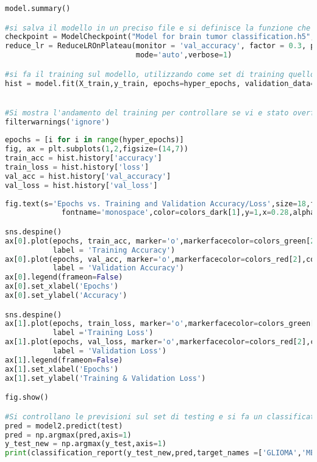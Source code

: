 \begin{lstlisting}[basicstyle=\tiny, language=Python, caption=Esempio di implementazione di AlexNet per la classificazione di RM con l'aggiunta di rumore al set di training.~\cite{dsbrain} ]
model.summary()

#si salva il modello in un preciso file e si definisce la funzione che regola il learning rate
checkpoint = ModelCheckpoint("Model for brain tumor classification.h5",monitor="val_accuracy",save_best_only=True,mode="auto",verbose=1)
reduce_lr = ReduceLROnPlateau(monitor = 'val_accuracy', factor = 0.3, patience = 2, min_delta = 0.001,min_lr= 0.000001,
                              mode='auto',verbose=1)

#si fa il training sul modello, utilizzando come set di training quello affetto da rumore
hist = model.fit(X_train,y_train, epochs=hyper_epochs, validation_data= (X_test,y_test),callbacks=[checkpoint,reduce_lr])


#Si mostra l'andamento del training per controllare se vi e stato overfitting  underfitting
filterwarnings('ignore') 
 
epochs = [i for i in range(hyper_epochs)]
fig, ax = plt.subplots(1,2,figsize=(14,7))
train_acc = hist.history['accuracy']
train_loss = hist.history['loss'] 
val_acc = hist.history['val_accuracy']
val_loss = hist.history['val_loss']
 
fig.text(s='Epochs vs. Training and Validation Accuracy/Loss',size=18,fontweight='bold',
             fontname='monospace',color=colors_dark[1],y=1,x=0.28,alpha=0.8)

sns.despine()
ax[0].plot(epochs, train_acc, marker='o',markerfacecolor=colors_green[2],color=colors_green[3],
           label = 'Training Accuracy')
ax[0].plot(epochs, val_acc, marker='o',markerfacecolor=colors_red[2],color=colors_red[3],
           label = 'Validation Accuracy') 
ax[0].legend(frameon=False)
ax[0].set_xlabel('Epochs') 
ax[0].set_ylabel('Accuracy')

sns.despine()
ax[1].plot(epochs, train_loss, marker='o',markerfacecolor=colors_green[2],color=colors_green[3],
           label ='Training Loss')
ax[1].plot(epochs, val_loss, marker='o',markerfacecolor=colors_red[2],color=colors_red[3],
           label = 'Validation Loss')
ax[1].legend(frameon=False)
ax[1].set_xlabel('Epochs')
ax[1].set_ylabel('Training & Validation Loss')

fig.show()

#Si controllano le previsioni sul set di testing e si fa un classification report
pred = model2.predict(test)
pred = np.argmax(pred,axis=1)
y_test_new = np.argmax(y_test,axis=1)
print(classification_report(y_test_new,pred,target_names =['GLIOMA','MENINGIOMA','NO TUMOR', 'PITUITARY']))


\end{lstlisting}
